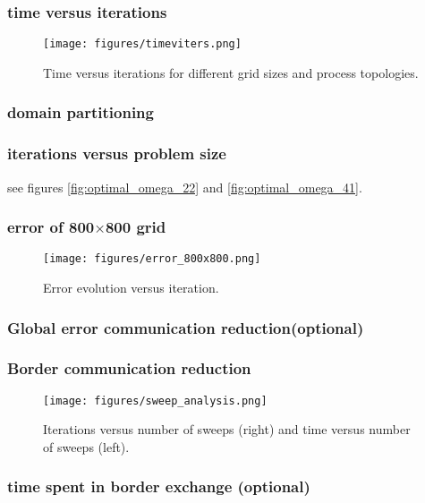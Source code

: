 \subsubsection{time versus iterations}
\begin{figure}[H]
    \centering
    \texttt{[image: figures/timeviters.png]}
    \caption{Time versus iterations for different grid sizes and process topologies.}
    \label{fig:timeviters}
\end{figure}

\subsubsection{domain partitioning}

\subsubsection{iterations versus problem size}
see figures \ref{fig:optimal_omega_22} and \ref{fig:optimal_omega_41}.

\subsubsection{error of 800$\times$800 grid}
\begin{figure}[H]
    \centering
    \texttt{[image: figures/error\_800x800.png]}
    \caption{Error evolution versus iteration.}
    \label{fig:error_800}
\end{figure}

\subsubsection{Global error communication reduction(optional)}

\subsubsection{Border communication reduction}
\begin{figure}[H]
    \centering
    \texttt{[image: figures/sweep\_analysis.png]}
    \caption{Iterations versus number of sweeps (right) and time versus number of sweeps (left).}
    \label{fig:sweep_analysis}
\end{figure}

\subsubsection{time spent in border exchange (optional)} 

